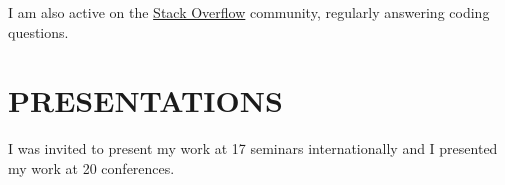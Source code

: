 \documentclass[10pt,a4paper]{article}
\begin{document}
{I am also active on the \href{https://stackoverflow.com/users/9281298/thomas-guillerme}{Stack Overflow} community, regularly answering coding questions.


\section{PRESENTATIONS}

I was invited to present my work at 17 seminars internationally and I presented my work at 20 conferences.

}
\end{document}
